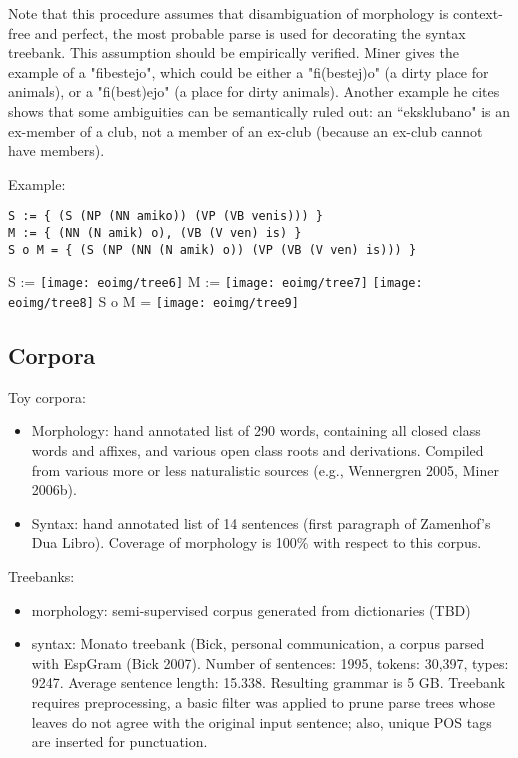 \documentclass[10pt,a4paper]{article}
\begin{document}
Note that this procedure assumes that disambiguation of morphology is
context-free and perfect, the most probable parse is used for decorating the
syntax treebank. This assumption should be empirically verified. Miner gives
the example of a "fibestejo", which could be either a "fi(bestej)o" 
(a dirty place for animals), or a "fi(best)ejo" (a place for dirty animals). 
Another example he cites shows that some ambiguities can be semantically ruled
out: an ``eksklubano" is an ex-member of a club, not a member of an ex-club (because
an ex-club cannot have members).

Example:

\begin{verbatim}
S := { (S (NP (NN amiko)) (VP (VB venis))) } 
M := { (NN (N amik) o), (VB (V ven) is) }
S o M = { (S (NP (NN (N amik) o)) (VP (VB (V ven) is))) }
\end{verbatim}
S := %
\texttt{[image: eoimg/tree6]}
M := %
\texttt{[image: eoimg/tree7]}
\texttt{[image: eoimg/tree8]}
S o M = %
\texttt{[image: eoimg/tree9]}

\subsection{Corpora}

Toy corpora:

\begin{itemize}
\item Morphology: hand annotated list of 290 words, containing all closed class
      words and affixes, and various open class roots and derivations. Compiled
      from various more or less naturalistic sources (e.g., Wennergren 2005,
      Miner 2006b).
\item Syntax: hand annotated list of 14 sentences (first paragraph of
      Zamenhof's Dua Libro). Coverage of morphology is 100\% with respect to
      this corpus.
\end{itemize}

Treebanks:

\begin{itemize}
\item morphology: semi-supervised corpus generated from dictionaries (TBD)
\item syntax: Monato treebank (Bick, personal communication, a corpus parsed
      with EspGram (Bick 2007).  Number of sentences: 1995, tokens: 30,397,
      types: 9247. Average sentence length: 15.338. Resulting grammar is 5 GB.
      Treebank requires preprocessing, a basic filter was applied to prune
      parse trees whose leaves do not agree with the original input sentence;
      also, unique POS tags are inserted for punctuation.
\end{itemize}
\end{document}
